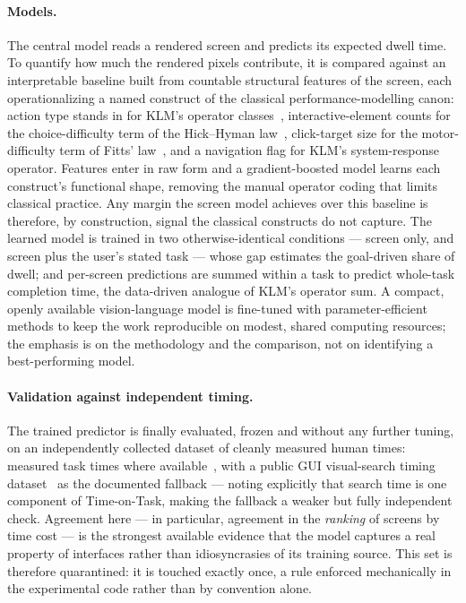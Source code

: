 \documentclass[11pt,a4paper]{article}
\begin{document}
\paragraph{Models.} The central model reads a rendered screen and predicts its expected dwell time. To quantify how much the rendered pixels contribute, it is compared against an interpretable baseline built from countable structural features of the screen, each operationalizing a named construct of the classical performance-modelling canon: action type stands in for KLM's operator classes~\cite{klm1980}, interactive-element counts for the choice-difficulty term of the Hick--Hyman law~\cite{hick1952}, click-target size for the motor-difficulty term of Fitts' law~\cite{fitts1954}, and a navigation flag for KLM's system-response operator. Features enter in raw form and a gradient-boosted model learns each construct's functional shape, removing the manual operator coding that limits classical practice. Any margin the screen model achieves over this baseline is therefore, by construction, signal the classical constructs do not capture. The learned model is trained in two otherwise-identical conditions --- screen only, and screen plus the user's stated task --- whose gap estimates the goal-driven share of dwell; and per-screen predictions are summed within a task to predict whole-task completion time, the data-driven analogue of KLM's operator sum. A compact, openly available vision-language model is fine-tuned with parameter-efficient methods to keep the work reproducible on modest, shared computing resources; the emphasis is on the methodology and the comparison, not on identifying a best-performing model.

\paragraph{Validation against independent timing.} The trained predictor is finally evaluated, frozen and without any further tuning, on an independently collected dataset of cleanly measured human times: measured task times where available~\cite{tasksense}, with a public GUI visual-search timing dataset~\cite{vsgui10k} as the documented fallback --- noting explicitly that search time is one component of Time-on-Task, making the fallback a weaker but fully independent check. Agreement here --- in particular, agreement in the \emph{ranking} of screens by time cost --- is the strongest available evidence that the model captures a real property of interfaces rather than idiosyncrasies of its training source. This set is therefore quarantined: it is touched exactly once, a rule enforced mechanically in the experimental code rather than by convention alone.
\end{document}
